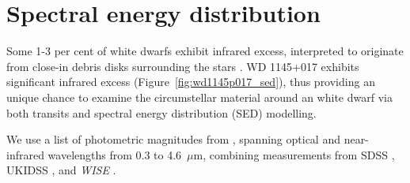 \documentclass[useAMS,usenatbib]{mn2e}
\begin{document}


\section{Spectral energy distribution}
\label{sec:SED}


Some 1-3 per cent of white dwarfs exhibit infrared excess, interpreted to originate from close-in debris disks surrounding the stars \citep[e.g.][]{2007ApJS..171..206M,2009ApJ...694..805F,2011MNRAS.417.1210G,2011ApJS..197...38D,2015MNRAS.449..574R}. WD 1145+017 exhibits significant infrared excess (Figure~\ref{fig:wd1145p017_sed}), thus providing an unique chance to examine the circumstellar material around an white dwarf via both transits and spectral energy distribution (SED) modelling. 

We use a list of photometric magnitudes from \citet{2015Natur.526..546V}, spanning optical and near-infrared wavelengths from 0.3 to 4.6~$\mu$m, combining measurements from SDSS \citep[$ugriz$;][]{2011ApJS..193...29A}, UKIDSS \citep[$YJHK$;][]{2007MNRAS.379.1599L}, and \textit{WISE} \citep[W1 and W2 -- W3 and W4 upper limits do not constrain the SED;][]{2010AJ....140.1868W}.%
\end{document}
